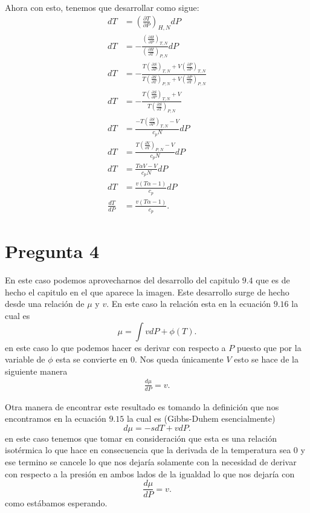 \documentclass{report}
\begin{document}
Ahora con esto, tenemos que desarrollar como sigue:
\begin{align*}
  dT &= \left( \frac{\partial T}{\partial P}  \right)_{H,N}dP \\
  dT &= -\frac{\left( \frac{\partial H}{\partial P}  \right)_{T,N}}{\left( \frac{\partial H}{\partial T}  \right)_{P,N}} dP \\
  dT &= -\frac{T\left( \frac{\partial S}{\partial P}  \right)_{T,N}+V\left( \frac{\partial P}{\partial P}  \right)_{T,N}}{T\left( \frac{\partial S}{\partial T}  \right)_{P,N}+V\left( \frac{\partial P}{\partial T}  \right)_{P,N}} \\
  dT &= - \frac{T\left( \frac{\partial S}{\partial P}  \right)_{T,N}+V}{T\left( \frac{\partial S}{\partial T}  \right)_{P,N}} \\
  dT &= \frac{-T\left( \frac{\partial S}{\partial P}  \right)_{T,N}-V}{c_p N} dP \\
  dT &= \frac{T\left( \frac{\partial V}{\partial T}  \right)_{P,N}-V}{c_pN} dP \\
  dT &= \frac{T\alpha V -V}{c_p N}dP \\
  dT &= \frac{v\left( T\alpha - 1 \right) }{c_p}dP \\
  \frac{dT}{dP} &= \frac{v\left( T\alpha - 1 \right) }{c_p}
.\end{align*}

\chapter{Pregunta 4}

En este caso podemos aprovecharnos del desarrollo del capitulo $9.4$ que es de hecho el capitulo en el que aparece la imagen. Este desarrollo surge de hecho desde una relación de  $\mu$ y  $v$. En este caso la relación esta en la ecuación  $9.16$ la cual es \[
\mu = \int v dP + \phi (T)
.\] en este caso lo que podemos hacer es derivar con respecto a $P$ puesto que por la variable de $\phi$ esta se convierte en 0. Nos queda únicamente $V$ esto se hace de la siguiente manera
 \begin{align*}
  \frac{d\mu}{dP} = v
.\end{align*}

Otra manera de encontrar este resultado es tomando la definición que nos encontramos en la ecuación $9.15$ la cual es (Gibbs-Duhem esencialmente) \[
d\mu = -sdT + vdP
.\] en este caso tenemos que tomar en consideración que esta es una relación isotérmica lo que hace en consecuencia que la derivada de la temperatura sea 0 y ese termino se cancele lo que nos dejaría solamente con la necesidad de derivar con respecto a la presión en ambos lados de la igualdad lo que nos dejaría con \[
\frac{d\mu}{dP} = v
.\] como estábamos esperando.
\end{document}
